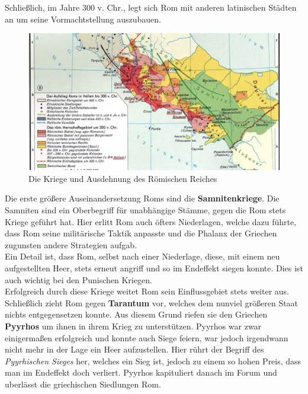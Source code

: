\documentclass{article}
\begin{document}
	Schließlich, im Jahre 300 v. Chr., legt sich Rom mit anderen latinischen Städten an um seine Vormachtstellung auszubauen. \\
	\begin{figure}
	\includegraphics{Samnitenkriege.jpeg}
	\caption{Die Kriege und Ausdehnung des Römischen Reiches}
	\end{figure}
	Die erste größere Auseinandersetzung Roms sind die \textbf{Samnitenkriege}. Die Samniten sind ein Oberbegriff für unabhängige Stämme, gegen die Rom stets Kriege geführt hat. Hier erlitt Rom auch öfters Niederlagen, welche dazu führte, dass Rom seine militärische Taktik anpasste und die Phalanx der Griechen zugunsten andere Strategien aufgab. \\
	Ein Detail ist, dass Rom, selbst nach einer Niederlage, diese, mit einem neu aufgestellten Heer, stets erneut angriff und so im Endeffekt siegen konnte. Dies ist auch wichtig bei den Punischen Kriegen. \\
	Erfolgreich durch diese Kriege weitet Rom sein Einflussgebiet stets weiter aus. Schließlich zieht Rom gegen \textbf{Tarantum} vor, welches dem nunviel größeren Staat nichts entgegensetzen konnte. Aus diesem Grund riefen sie den Griechen \textbf{Pyyrhos} um ihnen in ihrem Krieg zu unterstützen. Pyyrhos war zwar einigermaßen erfolgreich und konnte auch Siege feiern, war jedoch irgendwann nicht mehr in der Lage ein Heer aufzustellen. Hier rührt der Begriff des \textit{Pyyrhischen Sieges} her, welches ein Sieg ist, jedoch zu einem so hohen Preis, dass man im Endeffekt doch verliert. Pyyrhos kapituliert danach im Forum und uberlässt die griechischen Siedlungen Rom. \\
\end{document}
